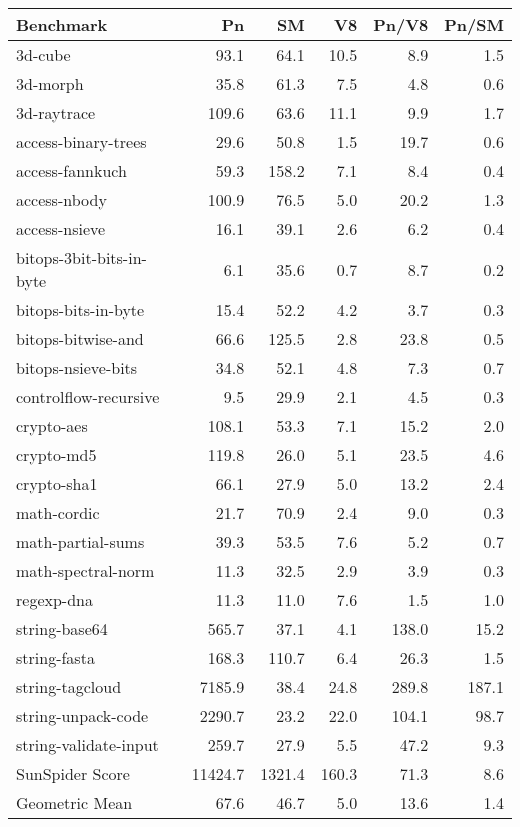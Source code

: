 \begin{tabular}{|l|r|r|r|r|r|}
  \hline
  Benchmark & Pn & SM & V8 & Pn/V8 & Pn/SM \\
  \hline \hline
  3d-cube & 93.1 & 64.1 & 10.5 & 8.9 & 1.5\\
  \hline
  3d-morph & 35.8 & 61.3 & 7.5 & 4.8 & 0.6\\
  \hline
  3d-raytrace & 109.6 & 63.6 & 11.1 & 9.9 & 1.7\\
  \hline
  access-binary-trees & 29.6 & 50.8 & 1.5 & 19.7 & 0.6\\
  \hline
  access-fannkuch & 59.3 & 158.2 & 7.1 & 8.4 & 0.4\\
  \hline
  access-nbody & 100.9 & 76.5 & 5.0 & 20.2 & 1.3\\
  \hline
  access-nsieve & 16.1 & 39.1 & 2.6 & 6.2 & 0.4\\
  \hline
  bitops-3bit-bits-in-byte & 6.1 & 35.6 & 0.7 & 8.7 & 0.2\\
  \hline
  bitops-bits-in-byte & 15.4 & 52.2 & 4.2 & 3.7 & 0.3\\
  \hline
  bitops-bitwise-and & 66.6 & 125.5 & 2.8 & 23.8 & 0.5\\
  \hline
  bitops-nsieve-bits & 34.8 & 52.1 & 4.8 & 7.3 & 0.7\\
  \hline
  controlflow-recursive & 9.5 & 29.9 & 2.1 & 4.5 & 0.3\\
  \hline
  crypto-aes & 108.1 & 53.3 & 7.1 & 15.2 & 2.0\\
  \hline
  crypto-md5 & 119.8 & 26.0 & 5.1 & 23.5 & 4.6\\
  \hline
  crypto-sha1 & 66.1 & 27.9 & 5.0 & 13.2 & 2.4\\
  \hline
  math-cordic & 21.7 & 70.9 & 2.4 & 9.0 & 0.3\\
  \hline
  math-partial-sums & 39.3 & 53.5 & 7.6 & 5.2 & 0.7\\
  \hline
  math-spectral-norm & 11.3 & 32.5 & 2.9 & 3.9 & 0.3\\
  \hline
  regexp-dna & 11.3 & 11.0 & 7.6 & 1.5 & 1.0\\
  \hline
  string-base64 & 565.7 & 37.1 & 4.1 & 138.0 & 15.2\\
  \hline
  string-fasta & 168.3 & 110.7 & 6.4 & 26.3 & 1.5\\
  \hline
  string-tagcloud & 7185.9 & 38.4 & 24.8 & 289.8 & 187.1\\
  \hline
  string-unpack-code & 2290.7 & 23.2 & 22.0 & 104.1 & 98.7\\
  \hline
  string-validate-input & 259.7 & 27.9 & 5.5 & 47.2 & 9.3\\
  \hline
  \hline
  SunSpider Score & 11424.7 & 1321.4 & 160.3 & 71.3 & 8.6\\
  Geometric Mean & 67.6 & 46.7 & 5.0 & 13.6 & 1.4\\
  \hline
\end{tabular}
